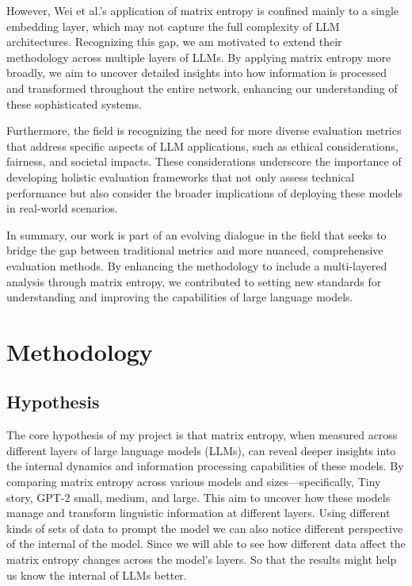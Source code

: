 \documentclass{article}
\begin{document}
However, Wei et al.'s application of matrix entropy is confined mainly to a single embedding layer, which may not capture the full complexity of LLM architectures. Recognizing this gap, we am motivated to extend their methodology across multiple layers of LLMs. By applying matrix entropy more broadly, we aim to uncover detailed insights into how information is processed and transformed throughout the entire network, enhancing our understanding of these sophisticated systems.

Furthermore, the field is recognizing the need for more diverse evaluation metrics that address specific aspects of LLM applications, such as ethical considerations, fairness, and societal impacts. These considerations underscore the importance of developing holistic evaluation frameworks that not only assess technical performance but also consider the broader implications of deploying these models in real-world scenarios.

In summary, our work is part of an evolving dialogue in the field that seeks to bridge the gap between traditional metrics and more nuanced, comprehensive evaluation methods. By enhancing the methodology to include a multi-layered analysis through matrix entropy, we contributed to setting new standards for understanding and improving the capabilities of large language models.



\section{Methodology}

\subsection{Hypothesis}
The core hypothesis of my project is that matrix entropy, when measured across different layers of large language models (LLMs), can reveal deeper insights into the internal dynamics and information processing capabilities of these models. By comparing matrix entropy across various models and sizes—specifically, Tiny story, GPT-2 small, medium, and large. This aim to uncover how these models manage and transform linguistic information at different layers. Using different kinds of sets of data to prompt the model we can also notice different perspective of the internal of the model. Since we will able to see how different data affect the matrix entropy changes across the model's layers. So that the results might help us know the internal of LLMs better.
\end{document}
